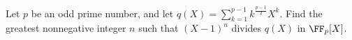 Let $p$ be an odd prime number, and let $q(X)=\displaystyle\sum_{k=1}^{p-1}k^{\frac{p-1}{2}}X^k$. Find the greatest nonnegative integer $n$ such that $(X-1)^n$ divides $q(X)$ in $\FF_p[X]$.
